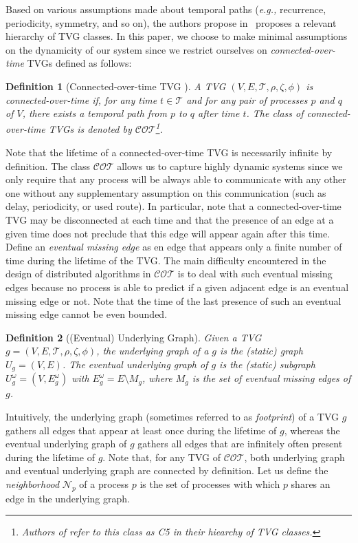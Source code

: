 \documentclass[11pt]{article}
\newtheorem{definition}{Definition}
\newcommand{\eg}{{\em e.g.,}\xspace}
\begin{document}
Based on various assumptions made about temporal paths (\eg recurrence, periodicity, symmetry, and so on), the authors propose in~\cite{CFQS12} proposes a relevant hierarchy of TVG classes. In this paper, we choose to make minimal assumptions on the dynamicity of our system since we restrict ourselves on \emph{connected-over-time} TVGs defined as follows: 

\begin{definition}[Connected-over-time TVG \cite{CFQS12}]\label{def:COT}
A TVG $(V,E,\mathcal{T},\rho,\zeta,\phi)$ is connected-over-time if, for any time $t\in\mathcal{T}$ and for any pair of processes $p$ and $q$ of $V$, there exists a temporal path from $p$ to $q$ after time $t$. The class of connected-over-time TVGs is denoted by $\mathcal{COT}$\footnote{Authors of \cite{CFQS12} refer to this class as C5 in their hiearchy of TVG classes.}.
\end{definition}

Note that the lifetime of a connected-over-time TVG is necessarily infinite by definition. The class $\mathcal{COT}$ allows us to capture highly dynamic systems since we only require that any process will be always able to communicate with any other one without any supplementary assumption on this communication (such as delay, periodicity, or used route). In particular, note that a connected-over-time TVG may be disconnected at each time and that the presence of an edge at a given time does not preclude that this edge will appear again after this time.  Define an \emph{eventual missing edge} as en edge that appears only a finite number of time during the lifetime of the TVG. The main difficulty encountered in the design of distributed algorithms in $\mathcal{COT}$ is to deal with such eventual missing edges because no process is able to predict if a given adjacent edge is an eventual missing edge or not. Note that the time of the last presence of such an eventual missing edge cannot be even bounded.

\begin{definition}[(Eventual) Underlying Graph]\label{def:UG}
Given a TVG $g=(V,E,\mathcal{T},\rho,\zeta,\phi)$, the underlying graph of a $g$ is the (static) graph $U_g=(V,E)$. The eventual underlying graph of $g$ is the (static) subgraph $U^\omega_g=(V,E^\omega_g)$ with $E^\omega_g=E \setminus M_g$, where $M_g$ is the set of eventual missing edges of $g$. 
\end{definition}

Intuitively, the underlying graph (sometimes referred to as {\em footprint}) of a TVG $g$ gathers all edges that appear at least once during the lifetime of $g$, whereas the eventual underlying graph of $g$ gathers all edges that are infinitely often present during the lifetime of $g$. Note that, for any TVG of $\mathcal{COT}$, both underlying graph and eventual underlying graph are connected by definition. Let us define the \emph{neighborhood} $\mathcal{N}_p$ of a process $p$ is the set of processes with which $p$ shares an edge in the underlying graph.
\end{document}
